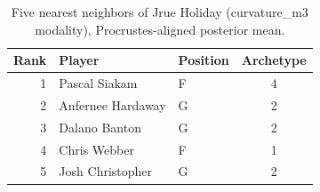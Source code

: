 \begin{table}[htbp]
  \centering\small
  \begin{tabular}{rllc}
    \toprule
    Rank & Player & Position & Archetype \\
    \midrule
    1 & Pascal Siakam & F & 4 \\
    2 & Anfernee Hardaway & G & 2 \\
    3 & Dalano Banton & G & 2 \\
    4 & Chris Webber & F & 1 \\
    5 & Josh Christopher & G & 2 \\
    \bottomrule
  \end{tabular}
  \caption{Five nearest neighbors of Jrue Holiday (curvature_m3 modality), Procrustes-aligned posterior mean.}
  \label{tab:Jrue_Holiday_neighbors_curvature_m3}
\end{table}

